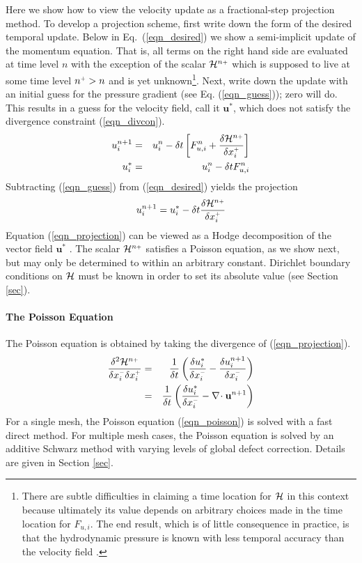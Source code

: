 \documentclass[11pt]{article}
\begin{document}
Here we show how to view the velocity update as a fractional-step projection method.  To develop a projection scheme, first write down the form of the desired temporal update.  Below in Eq.~(\ref{eqn_desired}) we show a semi-implicit update of the momentum equation.  That is, all terms on the right hand side are evaluated at time level $n$ with the exception of the scalar ${\cal H}^{n{\scriptscriptstyle +}}$ which is supposed to live at some time level $n^{\scriptscriptstyle +} >n$ and is yet unknown\footnote[1]{There are subtle difficulties in claiming a time location for $\cal H$ in this context because ultimately its value depends on arbitrary choices made in the time location for $F_{u,i}$. The end result, which is of little consequence in practice, is that the hydrodynamic pressure is known with less temporal accuracy than the velocity field \cite{Almgren}.}.  Next, write down the update with an initial guess for the pressure gradient (see Eq. (\ref{eqn_guess})); zero will do.  This results in a guess for the velocity field, call it $\mathbf{u}^*$, which does not satisfy the divergence constraint (\ref{eqn_divcon}).
\begin{eqnarray}
\label{eqn_desired} u_i^{n+1} &=& u_i^n - \delta t \left[ F_{u,i}^n + \frac{\delta {\cal H}^{n{\scriptscriptstyle +}}}{\delta x_i^{\scriptscriptstyle +}} \right] \\
\label{eqn_guess} u_i^* &=& u_i^n - \delta t F_{u,i}^n
\end{eqnarray}
Subtracting (\ref{eqn_guess}) from (\ref{eqn_desired}) yields the projection
\begin{equation}
\label{eqn_projection}
u_i^{n+1} = u_i^* - \delta t \frac{\delta {\cal H}^{n{\scriptscriptstyle +}}}{\delta x_i^{\scriptscriptstyle +}}
\end{equation}
Equation (\ref{eqn_projection}) can be viewed as a Hodge decomposition of the vector field $\mathbf{u}^*$ \cite{Chorin}.  The scalar ${\cal H}^{n{\scriptscriptstyle +}}$ satisfies a Poisson equation, as we show next, but may only be determined to within an arbitrary constant.  Dirichlet boundary conditions on ${\cal H}$ must be known in order to set its absolute value (see Section \ref{sec}).

\paragraph{The Poisson Equation}

The Poisson equation is obtained by taking the divergence of (\ref{eqn_projection}).
\begin{eqnarray}
\label{eqn_poisson}
\frac{\delta^2 {\cal H}^{n{\scriptscriptstyle +}}}{\delta x_i^{\scriptscriptstyle -}\delta x_i^{\scriptscriptstyle +}} &=& \frac{1}{\delta t}\left( \frac{\delta u_i^*}{\delta x_i^{\scriptscriptstyle -}} - \frac{\delta u_i^{n+1}}{\delta x_i^{\scriptscriptstyle -}} \right) \nonumber\\
&=& \frac{1}{\delta t}\left( \frac{\delta u_i^*}{\delta x_i^{\scriptscriptstyle -}} - \nabla\!\cdot \mathbf{u}^{n+1} \right)
\end{eqnarray}
For a single mesh, the Poisson equation (\ref{eqn_poisson}) is solved with a fast direct method.  For multiple mesh cases, the Poisson equation is solved by an additive Schwarz method with varying levels of global defect correction.  Details are given in Section \ref{sec}.
\end{document}

